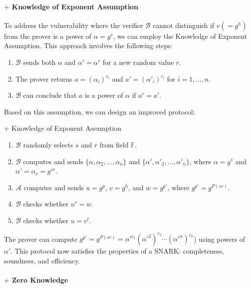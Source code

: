 \documentclass{article}
\begin{document}
\paragraph{$+$ Knowledge of Exponent Assumption}

To address the vulnerability where the verifier $\mathcal{B}$ cannot distinguish if $v (= g^h)$ from the prover is a power of $\alpha = g^s$, we can employ the Knowledge of Exponent Assumption. This approach involves the following steps:

\begin{enumerate}
    \item $\mathcal{B}$ sends both $\alpha$ and $\alpha' = \alpha^r$ for a new random value $r$.
    \item The prover returns $a = (\alpha_i)^{c_i}$ and $a' = (\alpha'_i)^{c_i}$ for $i = 1, ..., n$.
    \item $\mathcal{B}$ can conclude that $a$ is a power of $\alpha$ if $a^r = a'$.
\end{enumerate}

Based on this assumption, we can design an improved protocol:

\begin{protocol}{$+$ Knowledge of Exponent Assumption}{}
\begin{enumerate}
    \item $\mathcal{B}$ randomly selects $s$ and $r$ from field $\mathbb{F}$.
    \item $\mathcal{B}$ computes and sends $\{\alpha, \alpha_2, ..., \alpha_{n}\}$ and $\{\alpha', \alpha'_2, ..., \alpha'_{n}\}$, where $\alpha = g^{s}$ and $\alpha' = \alpha_{r} = g^{sr}$.
    \item $\mathcal{A}$ computes and sends $u = g^{p}$, $v = g^{h}$, and $w = g^{p'}$, where $g^{p'} = g^{P(sr)}$.
    \item $\mathcal{B}$ checks whether $u^{r} = w$.
    \item $\mathcal{B}$ checks whether $u = v^{t}$.
\end{enumerate}
\end{protocol}

The prover can compute $g^{p'} = g^{P(sr)} = \alpha'^{c_1} (\alpha'^{2})^{c_2} \cdots (\alpha'^{n})^{c_n}$) using powers of $\alpha'$. This protocol now satisfies the properties of a SNARK: completeness, soundness, and efficiency.

\paragraph{$+$ Zero Knowledge}
\end{document}
